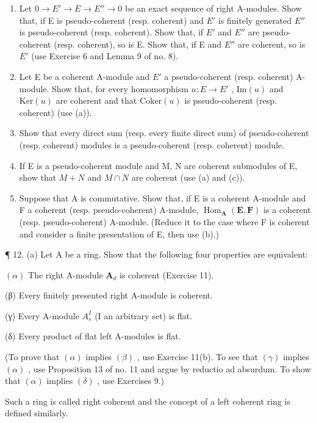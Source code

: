 \begin{enumerate}
\def\labelenumi{(\alph{enumi})}
\item
  Let \(0 \to E' \to E \to E'' \to 0\) be an exact sequence of right A-modules. Show that, if E is pseudo-coherent (resp. coherent) and \(E'\) is finitely generated \(E''\) is pseudo-coherent (resp. coherent). Show that, if \(E'\) and \(E''\) are pseudo-coherent (resp. coherent), so is E. Show that, if E and \(E''\) are coherent, so is \(E'\) (use Exercise 6 and Lemma 9 of no. 8).
\item
  Let E be a coherent A-module and \(E'\) a pseudo-coherent (resp. coherent) A-module. Show that, for every homomorphism \(u: E \to E'\) , \(\text{Im}(u)\) and \(\text{Ker}(u)\) are coherent and that \(\text{Coker}(u)\) is pseudo-coherent (resp. coherent) (use (a)).
\item
  Show that every direct sum (resp. every finite direct sum) of pseudo-coherent (resp. coherent) modules is a pseudo-coherent (resp. coherent) module.
\item
  If E is a pseudo-coherent module and M, N are coherent submodules of E, show that \(M + N\) and \(M \cap N\) are coherent (use (a) and (c)).
\item
  Suppose that A is commutative. Show that, if E is a coherent A-module and F a coherent (resp. pseudo-coherent) A-module, \(\operatorname{Hom}_{\mathbf{A}}(\mathbf{E}, \mathbf{F})\) is a coherent (resp. pseudo-coherent) A-module. (Reduce it to the case where F is coherent and consider a finite presentation of E, then use (b).)
\end{enumerate}

¶ 12. (a) Let A be a ring. Show that the following four properties are equivalent:

\((\alpha)\) The right A-module \(\mathbf{A}_d\) is coherent (Exercise 11).

(β) Every finitely presented right A-module is coherent.

(γ) Every A-module \(A_{s}^{I}\) (I an arbitrary set) is flat.

(δ) Every product of flat left A-modules is flat.

(To prove that \((\alpha)\) implies \((\beta)\) , use Exercise 11(b). To see that \((\gamma)\) implies \((\alpha)\) , use Proposition 13 of no. 11 and argue by reductio ad absurdum. To show that \((\alpha)\) implies \((\delta)\) , use Exercises 9.)

Such a ring is called right coherent and the concept of a left coherent ring is defined similarly.

